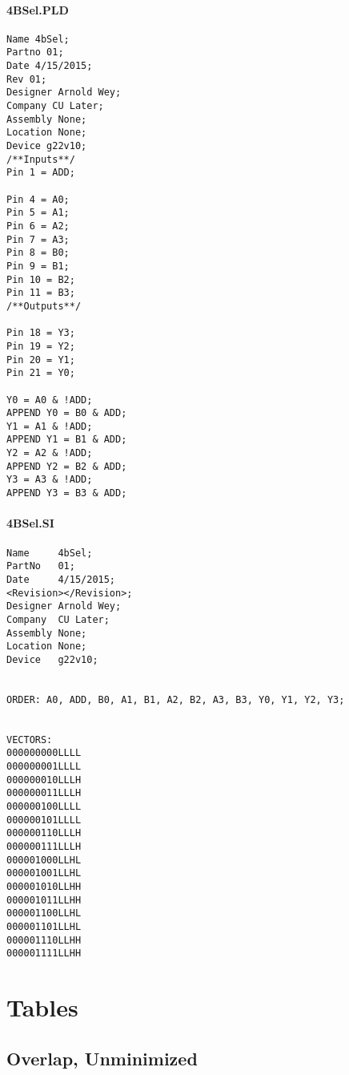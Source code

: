 \documentclass[letterpaper,titlepage,oneside]{article}
\begin{document}
\pagebreak
\paragraph*{4BSel.PLD}
\label{code: 4BSel}
\begin{lstlisting}
Name 4bSel;
Partno 01;
Date 4/15/2015;
Rev 01;
Designer Arnold Wey;
Company CU Later;
Assembly None;
Location None;
Device g22v10;
/**Inputs**/
Pin 1 = ADD;

Pin 4 = A0;
Pin 5 = A1;
Pin 6 = A2;
Pin 7 = A3;
Pin 8 = B0;
Pin 9 = B1;
Pin 10 = B2;
Pin 11 = B3;
/**Outputs**/

Pin 18 = Y3;
Pin 19 = Y2;
Pin 20 = Y1;
Pin 21 = Y0;

Y0 = A0 & !ADD;
APPEND Y0 = B0 & ADD;
Y1 = A1 & !ADD;
APPEND Y1 = B1 & ADD;
Y2 = A2 & !ADD;
APPEND Y2 = B2 & ADD;
Y3 = A3 & !ADD;
APPEND Y3 = B3 & ADD;

\end{lstlisting}
\pagebreak
\paragraph*{4BSel.SI}
\label{code: 4BSelSi}
\begin{lstlisting}
Name     4bSel;
PartNo   01;
Date     4/15/2015;
<Revision></Revision>;
Designer Arnold Wey;
Company  CU Later;
Assembly None;
Location None;
Device   g22v10;


ORDER: A0, ADD, B0, A1, B1, A2, B2, A3, B3, Y0, Y1, Y2, Y3; 


VECTORS:
000000000LLLL
000000001LLLL
000000010LLLH
000000011LLLH
000000100LLLL
000000101LLLL
000000110LLLH
000000111LLLH
000001000LLHL
000001001LLHL
000001010LLHH
000001011LLHH
000001100LLHL
000001101LLHL
000001110LLHH
000001111LLHH
\end{lstlisting}


\pagebreak
\section{Tables}

\subsection*{Overlap, Unminimized}
\end{document}
